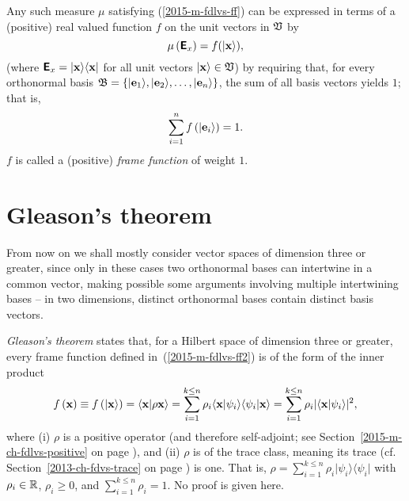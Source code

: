 Any such measure $\mu $ satisfying (\ref{2015-m-fdlvs-ff})
can be expressed in terms of a (positive) real valued function $f$ on the unit vectors in  ${\frak V}$
by
\begin{equation}
\mu \left( \textsf{\textbf{E}}_x \right)=
f( \vert {\bf x} \rangle )
,
\label{2015-m-fdlvs-ffmuf}
\end{equation}
(where $\textsf{\textbf{E}}_x= \vert {\bf x}  \rangle \langle {\bf x}  \vert$ for all  unit vectors $\vert {\bf x}  \rangle \in {\frak V}$)
by requiring that,
for every orthonormal basis
${\frak B} =\{
\vert {\bf e}_1 \rangle ,
\vert {\bf e}_2 \rangle ,
\ldots ,
\vert {\bf e}_n \rangle
\}$,  the sum of all basis vectors yields $1$; that is,
\begin{equation}
\sum_{i=1}^n f \left( \vert {\bf e}_i \rangle \right)
=1
.
\label{2015-m-fdlvs-ff2}
\end{equation}
$f$ is called a (positive) {\em frame function} of weight $1$.

\section{Gleason's theorem}
\label{Gleasontheorem}

From now on we shall mostly consider vector spaces of dimension three or greater,
since only in these cases two orthonormal bases can intertwine in a common vector, making possible
some arguments involving multiple intertwining bases  -- in two dimensions,
distinct orthonormal bases contain distinct basis vectors.


{\em Gleason's theorem} \cite{Gleason,r:dvur-93,pitowsky:218,rich-bridge,peres,hamhalter-book}
states that,
for a Hilbert space of dimension three or greater,
every frame function defined in~(\ref{2015-m-fdlvs-ff2})
is of the form  of the inner product
\begin{equation}
f \left(   {\bf x}   \right)
\equiv
f \left( \vert {\bf x} \rangle \right)
=
\langle {\bf x}  \vert \rho {\bf x} \rangle
=
\sum_{i=1}^{k\le n} \rho_i
\langle {\bf x}  \vert \psi_i\rangle \langle \psi_i \vert {\bf x} \rangle
=
\sum_{i=1}^{k\le n} \rho_i
\vert \langle {\bf x}  \vert \psi_i\rangle \vert^2
,
\label{2016-m-fdlvsgleason-f}
\end{equation}
where
(i) $\rho $
is a positive operator (and therefore self-adjoint;
see Section~\ref{2015-m-ch-fdlvs-positive} on page \pageref{2015-m-ch-fdlvs-positive}),
and
(ii) $\rho $ is
of the trace class,
meaning its trace (cf. Section~\ref{2013-ch-fdvs-trace} on page \pageref{2013-ch-fdvs-trace}) is one.
That is, $\rho=
\sum_{i=1}^{k\le n} \rho_i \vert \psi_i \rangle \langle \psi_i \vert$
with $\rho_i \in {\Bbb R}$, $\rho_i \ge 0$, and $\sum_{i=1}^{k\le n} \rho_i =1$.
No proof is given here.

